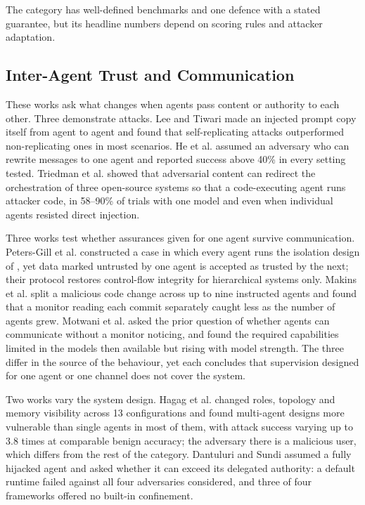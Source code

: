 The category has well-defined benchmarks and one defence with a stated guarantee, but its headline numbers depend on scoring rules and attacker adaptation.

\subsection{Inter-Agent Trust and Communication}
These works ask what changes when agents pass content or authority to each other. Three demonstrate attacks. Lee and Tiwari \cite{r24} made an injected prompt copy itself from agent to agent and found that self-replicating attacks outperformed non-replicating ones in most scenarios. He et al. \cite{r25} assumed an adversary who can rewrite messages to one agent and reported success above 40\% in every setting tested. Triedman et al. \cite{r26} showed that adversarial content can redirect the orchestration of three open-source systems so that a code-executing agent runs attacker code, in 58–90\% of trials with one model and even when individual agents resisted direct injection.

Three works test whether assurances given for one agent survive communication. Peters-Gill et al. \cite{r27} constructed a case in which every agent runs the isolation design of \cite{r23}, yet data marked untrusted by one agent is accepted as trusted by the next; their protocol restores control-flow integrity for hierarchical systems only. Makins et al. \cite{r28} split a malicious code change across up to nine instructed agents and found that a monitor reading each commit separately caught less as the number of agents grew. Motwani et al. \cite{r29} asked the prior question of whether agents can communicate without a monitor noticing, and found the required capabilities limited in the models then available but rising with model strength. The three differ in the source of the behaviour, yet each concludes that supervision designed for one agent or one channel does not cover the system.

Two works vary the system design. Hagag et al. \cite{r30} changed roles, topology and memory visibility across 13 configurations and found multi-agent designs more vulnerable than single agents in most of them, with attack success varying up to 3.8 times at comparable benign accuracy; the adversary there is a malicious user, which differs from the rest of the category. Dantuluri and Sundi \cite{r31} assumed a fully hijacked agent and asked whether it can exceed its delegated authority: a default runtime failed against all four adversaries considered, and three of four frameworks offered no built-in confinement.

